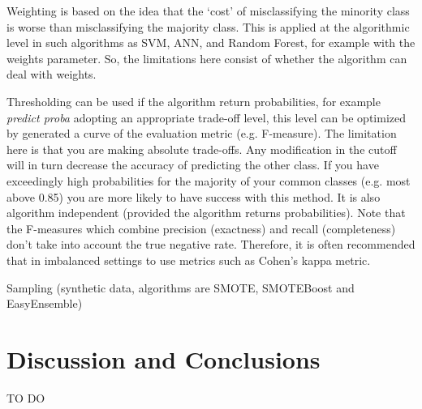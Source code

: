 \documentclass[11pt]{article}
\theoremstyle{definition}
\theoremstyle{remark}
\begin{document}
{Weighting is based on the idea that the ‘cost’ of misclassifying the minority class is worse than misclassifying the majority  class. This is applied at the algorithmic level in such algorithms as SVM, ANN, and Random Forest, for example with the weights parameter. So, the limitations here consist of whether the algorithm can deal with weights.


Thresholding can be used if the algorithm return probabilities, for example \textit{predict proba} adopting an appropriate trade-off level, this level can be optimized by generated a curve of the evaluation metric (e.g. F-measure). The limitation here is that you are making absolute trade-offs. Any modification in the cutoff will in turn decrease the accuracy of predicting the other class. If you have exceedingly high probabilities for the majority of your common classes (e.g. most above 0.85) you are more likely to have success with this method. It is also algorithm independent (provided the algorithm returns probabilities).
Note that the F-measures which combine precision (exactness) and recall (completeness) don’t take into account the true negative rate. Therefore, it is often recommended that in imbalanced settings to use metrics such as Cohen’s kappa metric.

Sampling (synthetic data, algorithms are SMOTE, SMOTEBoost and EasyEnsemble)


\section{Discussion and Conclusions}
\label{se:dis}
TO DO

}
\end{document}
